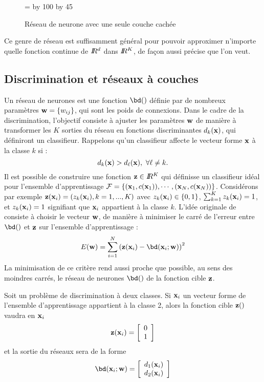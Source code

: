 \begin{figure}[hbtp]
\begin{center}
\leavevmode
\epsfxsize=\textwidth
\divide\epsfxsize by 100
\multiply\epsfxsize by 45
\\
\caption{R\'eseau de neurone avec une seule couche cach\'ee}
\label{fig:mlfn}
\end{center}
\end{figure}




Ce genre de r\'eseau est suffisamment g\'en\'eral pour pouvoir approximer n'importe
quelle fonction continue de $I\!\!R^d$ dans $I\!\!R^K$, de fa\c{c}on aussi pr\'ecise
que l'on veut.

\subsection{Discrimination et r\'eseaux \`a couches}
Un r\'eseau de neurones est une fonction $\bd()$ d\'efinie par de nombreux
param\`etres $\mbox{\bf w}=\{w_{ij}\}$, qui sont les poids de connexions. Dans le
cadre de la discrimination, l'objectif consiste \`a ajuster les param\`etres
$\mbox{\bf w}$ de mani\`ere \`a transformer les $K$ sorties du r\'eseau en fonctions
discriminantes  $d_k(\mbox{\bf x})$, qui d\'efiniront un classifieur. Rappelons qu'un   
classifieur affecte le vecteur forme $\mbox{\bf x}$ \`a la classe $k$  si :
$$
d_k(\mbox{\bf x})>d_\ell(\mbox{\bf x}), \ \forall \ell \neq k.
$$  
Il est possible de construire une fonction $\mbox{\bf z} \in I\!\!R^K$ qui d\'efinisse
un classifieur id\'eal pour l'ensemble d'apprentissage  
${\cal F}=\{(\mbox{\bf x}_1,c(\mbox{\bf x}_1)),\cdots,(\mbox{\bf x}_N,c(\mbox{\bf x}_N))\}$. Consid\'erons
par exemple  $\mbox{\bf z}(\mbox{\bf x}_i)=(z_k(\mbox{\bf x}_i),k=1,...,K)$ avec $z_k(\mbox{\bf x}_i) \in \{0,1\}$,
$\sum_{k=1}^K  z_k(\mbox{\bf x}_i)=1$, et $z_k(\mbox{\bf x}_i)=1$ signifiant que $\mbox{\bf x}_i$ appartient
\`a la classe $k$.
 L'id\'ee originale de  consiste
\`a choisir le vecteur $\mbox{\bf w}$, de mani\`ere \`a minimiser le carr\'e
de l'erreur entre $\bd()$ et $\mbox{\bf z}$ sur l'ensemble d'apprentissage :
$$
E(\bw)=\sum_{i=1}^N \left( \z(\x_i) - \bd(\x_i ; \bw) \right)^2
$$
La minimisation de ce crit\`ere rend aussi proche que
possible, au sens des moindres carr\'es, le r\'eseau de neurones $\bd()$
de la fonction cible $\mbox{\bf z}$. 
\begin{ex}
Soit un probl\`eme de discrimination \`a deux classes. 
Si $\mbox{\bf x}_i$ un vecteur forme de l'ensemble d'apprentissage appartient 
\`a la classe 2, alors la fonction cible $\mbox{\bf z}()$
vaudra en  $\mbox{\bf x}_i$
$$
\mbox{\bf z}(\mbox{\bf x}_i)= \left [  \begin{array}{c} 0  \\  1 \end{array}\right ]
$$ 
et la sortie du r\'eseaux sera de la forme
$$
\bd(\x_i;\bw)= \left [  \begin{array}{c} d_1(\x_i)  \\  d_2(\x_i) \end{array}\right ]
$$
\end{ex}

